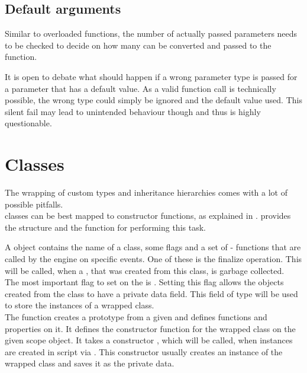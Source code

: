 \subsection{Default arguments}

Similar to overloaded functions, the number of actually passed parameters needs to be checked to decide on how many can be converted and passed to the  function.

It is open to debate what should happen if a wrong parameter type is passed for a parameter that has a default value. As a valid function call is technically possible, the wrong type could simply be ignored and the default value used. This silent fail may lead to unintended behaviour though and thus is highly questionable.

\section{Classes}
\label{sec:StructsAndClasses}

The wrapping of custom types and inheritance hierarchies comes with a lot of possible pitfalls.\\
 classes can be best mapped to  constructor functions, as explained in .  provides the structure  and the function  for performing this task.

A  object contains the name of a class, some flags and a set of  - functions that are called by the  engine on specific events. One of these  is the finalize operation. This will be called, when a , that was created from this class, is garbage collected.\\
The most important flag to set on the  is . Setting this flag allows the objects created from the class to have a private data field. This field of type  will be used to store the instances of a wrapped  class.\\
The function  creates a prototype  from a given  and defines functions and properties on it. It defines the  constructor function for the wrapped class on the given scope object. It takes a constructor , which will be called, when instances are created in script via . This constructor usually creates an instance of the wrapped  class and saves it as the private data.

